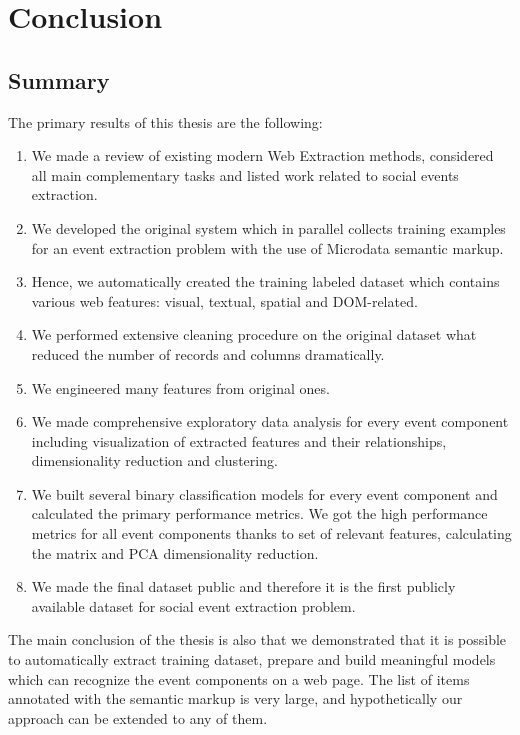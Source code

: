 \chapter{Conclusion}
\label{chap:conclusion}

\section{Summary}

The primary results of this thesis are the following: 
\begin{enumerate}
    \item We made a review of existing modern Web Extraction methods, considered all main complementary tasks and listed work related to social events extraction.   
    \item We developed the original system which in parallel collects training examples for an event extraction problem with the use of Microdata semantic markup.
    \item Hence, we automatically created the training labeled dataset which contains various web features: visual, textual, spatial and DOM-related.
    \item We performed extensive cleaning procedure on the original dataset what reduced the number of records and columns dramatically.
    \item We engineered many features from original ones.
    \item We made comprehensive exploratory data analysis for every event component including visualization of extracted features and their relationships, dimensionality reduction and clustering.
    \item We built several binary classification models for every event component and calculated the primary performance metrics. We got the high performance metrics for all event components thanks to set of relevant features, calculating the  matrix and PCA dimensionality reduction.
    \item We made the final dataset public and therefore it is the first publicly available dataset for social event extraction problem.
\end{enumerate}

The main conclusion of the thesis is also that we demonstrated that it is possible to automatically extract training dataset, prepare and build meaningful models which can recognize the event components on a web page. The list of items annotated with the semantic markup is very large, and hypothetically our approach can be extended to any of them. 


